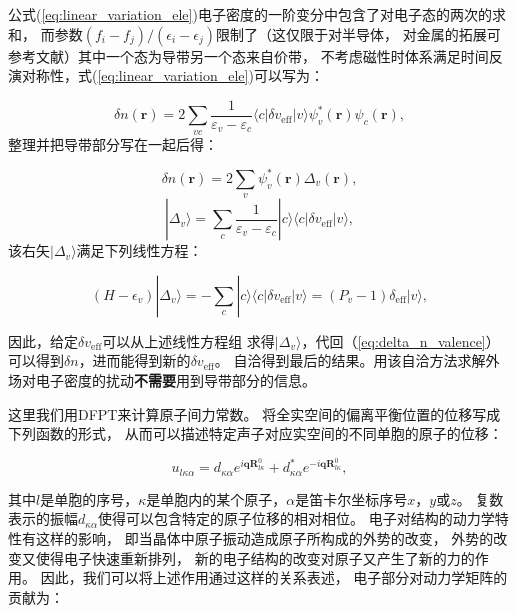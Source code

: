 公式(\ref{eq:linear_variation_ele})电子密度的一阶变分中包含了对电子态的两次的求和，
而参数$(f_i-f_j)/(\epsilon_i-\epsilon_j)$限制了（这仅限于对半导体，
对金属的拓展可参考文献\cite{de1995lattice}）其中一个态为导带另一个态来自价带，
不考虑磁性时体系满足时间反演对称性，式(\ref{eq:linear_variation_ele})可以写为：

\begin{equation}
  \delta n(\bm{r}) = 2\sum_{vc}\frac{1}{\varepsilon_v-\varepsilon_c}
  \langle c| \delta v_\mathrm{eff} | v\rangle \psi^*_v(\bm{r})\psi_c(\bm{r}) ,
\end{equation}
整理并把导带部分写在一起后得：

\begin{equation}\label{eq:delta_n_valence}
  \delta n(\bm{r}) = 2\sum_v \psi^*_v(\bm{r}) \Delta_v(\bm{r}) ,
\end{equation}
\begin{equation}
  |\Delta_v \rangle = \sum_{c}\frac{1}{\varepsilon_v-\varepsilon_c}
  |c\rangle \langle c| \delta v_\mathrm{eff} | v\rangle ,
\end{equation}
该右矢$|\Delta_v\rangle$满足下列线性方程：

\begin{equation}
  (H-\epsilon_v)|\Delta_v\rangle = -\sum_c |c\rangle \langle c| \delta v_\mathrm{eff} | v\rangle = (P_v-1)\delta_\mathrm{eff}|v\rangle ,
\end{equation}

因此，给定$\delta v_\mathrm{eff}$可以从上述线性方程组
求得$|\Delta_v\rangle$，代回（\ref{eq:delta_n_valence}）
可以得到$\delta n$，进而能得到新的$\delta v_\mathrm{eff}$。
自洽得到最后的结果。用该自洽方法求解外场对电子密度的扰动{\textbf{不需要}}用到导带部分的信息。

这里我们用DFPT来计算原子间力常数。
将全实空间的偏离平衡位置的位移写成下列函数的形式，
从而可以描述特定声子对应实空间的不同单胞的原子的位移：

\begin{equation}
  u_{l\kappa\alpha} = d_{\kappa\alpha}e^{i\bm{q}\bm{R}^0_{l\kappa}} + d^*_{\kappa\alpha}e^{-i\bm{q}\bm{R}^0_{l\kappa}} ,
\end{equation}

其中$l$是单胞的序号，$\kappa$是单胞内的某个原子，$\alpha$是笛卡尔坐标序号$x$，$y$或$z$。
复数表示的振幅$d_{\kappa\alpha}$使得可以包含特定的原子位移的相对相位。
电子对结构的动力学特性有这样的影响，
即当晶体中原子振动造成原子所构成的外势的改变，
外势的改变又使得电子快速重新排列，
新的电子结构的改变对原子又产生了新的力的作用。
因此，我们可以将上述作用通过这样的关系表述，
电子部分对动力学矩阵的贡献为：

